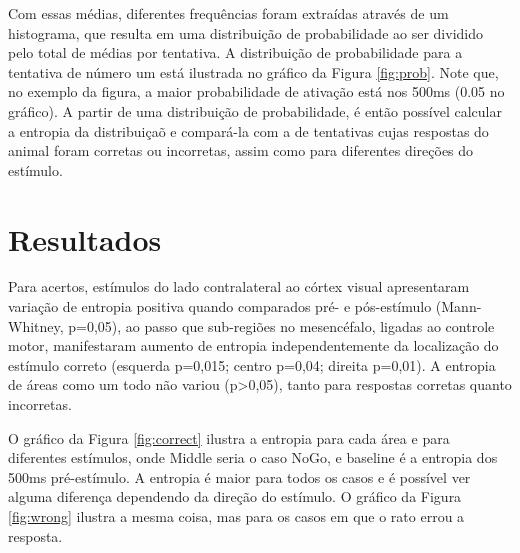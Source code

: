 \documentclass[conference]{IEEEtran}
\begin{document}

Com essas médias, diferentes frequências foram extraídas através de um histograma, que resulta em uma distribuição de probabilidade ao ser dividido pelo total de médias por tentativa. A distribuição de probabilidade para a tentativa de número um está ilustrada no gráfico da Figura \ref{fig:prob}. Note que, no exemplo da figura, a maior probabilidade de ativação está nos 500ms (0.05 no gráfico). A partir de uma distribuição de probabilidade, é então possível calcular a entropia da distribuiçaõ e compará-la com a de tentativas cujas respostas do animal foram corretas ou incorretas, assim como para diferentes direções do estímulo.


\section{Resultados}

Para acertos, estímulos do lado contralateral ao córtex visual apresentaram variação de entropia positiva quando comparados pré- e pós-estímulo (Mann-Whitney, p=0,05), ao passo que sub-regiões no mesencéfalo, ligadas ao controle motor, manifestaram aumento de entropia independentemente da localização do estímulo correto (esquerda p=0,015; centro p=0,04; direita p=0,01). A entropia de áreas como um todo não variou (p>0,05), tanto para respostas corretas quanto incorretas.

O gráfico da Figura \ref{fig:correct} ilustra a entropia para cada área e para diferentes estímulos, onde Middle seria o caso NoGo, e baseline é a entropia dos 500ms pré-estímulo. A entropia é maior para todos os casos e é possível ver alguma diferença dependendo da direção do estímulo. O gráfico da Figura \ref{fig:wrong} ilustra a mesma coisa, mas para os casos em que o rato errou a resposta.


\end{document}
